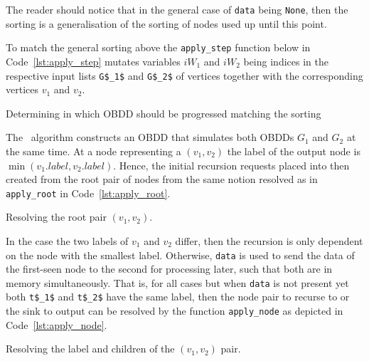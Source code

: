 The reader should notice that in the general case of \lstinline{data} being
\lstinline{None}, then the sorting is a generalisation of the sorting of nodes
used up until this point.

To match the general sorting above the \lstinline{apply_step} function below in
Code~\ref{lst:apply_step} mutates variables $\mathit{iW}_1$ and $\mathit{iW}_2$
being indices in the respective input lists \lstinline{G$_1$} and
\lstinline{G$_2$} of vertices together with the corresponding vertices $v_1$ and
$v_2$.
\begin{lstfloat}
  \centering

  

  \caption{Determining in which OBDD should be progressed matching the sorting}
  \label{lst:apply_step}
\end{lstfloat}

The \Apply\ algorithm constructs an OBDD that simulates both OBDDs $G_1$ and
$G_2$ at the same time. At a node representing a $(v_1,v_2)$ the label of the
output node is $\min(v_1.\mathit{label},v_2.\mathit{label})$. Hence, the initial
recursion requests placed into then created from the root pair of nodes from the
same notion resolved as in \lstinline{apply_root} in Code~\ref{lst:apply_root}.
\begin{lstfloat}[hb!]
  \centering

  

  \caption{Resolving the root pair $(v_1, v_2)$.}
  \label{lst:apply_root}
\end{lstfloat}


In the case the two labels of $v_1$ and $v_2$ differ, then the recursion is only
dependent on the node with the smallest label. Otherwise, \lstinline{data} is
used to send the data of the first-seen node to the second for processing later,
such that both are in memory simultaneously. That is, for all cases but when
\lstinline{data} is not present yet both \lstinline{t$_1$} and \lstinline{t$_2$}
have the same label, then the node pair to recurse to or the sink to output can
be resolved by the function \lstinline{apply_node} as depicted in
Code~\ref{lst:apply_node}.
\begin{lstfloat}[ht!]
  \centering

  

  \caption{Resolving the label and children of the $(v_1, v_2)$ pair.}
  \label{lst:apply_node}
\end{lstfloat}

